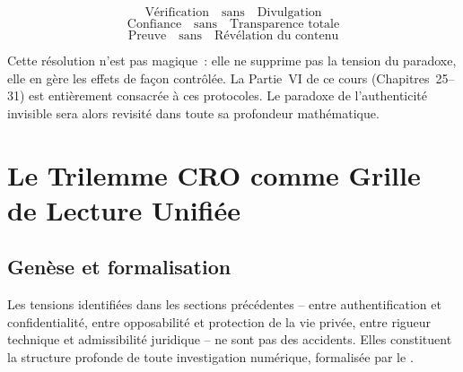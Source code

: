 \[
\text{Vérification} \quad \text{sans} \quad \text{Divulgation}
\]
\[
\text{Confiance} \quad \text{sans} \quad \text{Transparence totale}
\]
\[
\text{Preuve} \quad \text{sans} \quad \text{Révélation du contenu}
\]

Cette résolution n'est pas magique~: elle ne supprime pas la tension
du paradoxe, elle en gère les effets de façon contrôlée. La Partie~VI
de ce cours (Chapitres~25--31) est entièrement consacrée à ces protocoles.
Le paradoxe de l'authenticité invisible sera alors revisité dans toute
sa profondeur mathématique.

\section{Le Trilemme CRO comme Grille de Lecture Unifiée}

\subsection{Genèse et formalisation}

Les tensions identifiées dans les sections précédentes -- entre
authentification et confidentialité, entre opposabilité et protection de
la vie privée, entre rigueur technique et admissibilité juridique -- ne
sont pas des accidents. Elles constituent la structure profonde de toute
investigation numérique, formalisée par le 
\cite{minka2025cro}.

